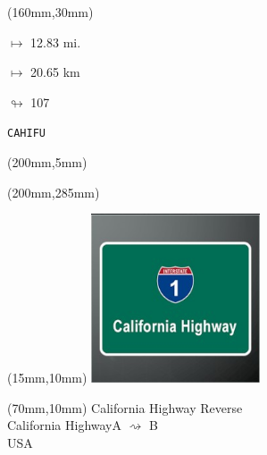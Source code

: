 \begin{textblock*}{40mm}(160mm,30mm)%
\Large
\par$\mapsto$ 12.83 mi.
\par$\mapsto$ 20.65 km
\par$\looparrowright$ 107
\par\hfill\tiny\tt CAHIFU\\
\end{textblock*}
\begin{textblock*}{20mm}(200mm,5mm)%
\fbox{\thepage}
\label{CAHIFU}
\end{textblock*}
\begin{textblock*}{20mm}(200mm,285mm)%
\fbox{\thepage}
\end{textblock*}

\null\newpage
\begin{textblock*}{50mm}(15mm,10mm)%
\includegraphics[width=50mm]{LG/2015-05-20_00077.png}
\end{textblock*}
\begin{textblock*}{130mm}(70mm,10mm)%
{\fontsize{20}{20}\selectfont California Highway Reverse\\}
{\fontsize{16}{16}\selectfont California Highway\hfill A $\rightsquigarrow$ B\\}
{\fontsize{12}{12}\selectfont USA\\}
\end{textblock*}
